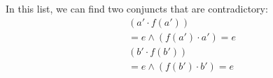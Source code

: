\documentclass[12pt,letterpaper, onecolumn]{exam}
\begin{document}
\begin{questions}
	In this list, we can find two conjuncts that are contradictory:
	\begin{align*}
		(a' \cdot f(a'))  \\ = e \land (f(a') \cdot a') = e \\
		(b' \cdot f(b'))  \\ = e \land (f(b') \cdot b') = e
	\end{align*}


\end{questions}
\end{document}
